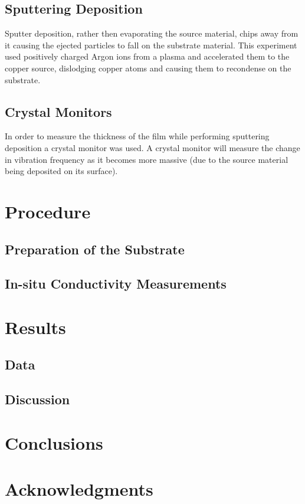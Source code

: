 \documentclass[aps,prl,twocolumn,groupedaddress,showkeys]{revtex4}
\begin{document}
\subsection{Sputtering Deposition}

Sputter deposition, rather then evaporating the source material, chips away from it causing the ejected particles to fall on the substrate material. This experiment used positively charged Argon ions from a plasma and accelerated them to the copper source, dislodging copper atoms and causing them to recondense on the substrate.


\subsection{Crystal Monitors}

In order to measure the thickness of the film while performing sputtering deposition a crystal monitor was used. A crystal monitor will measure the change in vibration frequency as it becomes more massive (due to the source material being deposited on its surface).


\section{Procedure}

\subsection{Preparation of the Substrate}

\subsection{In-situ Conductivity Measurements}



\section{Results}

\subsection{Data}

\subsection{Discussion}

\section{Conclusions}

\section{Acknowledgments}
\end{document}
